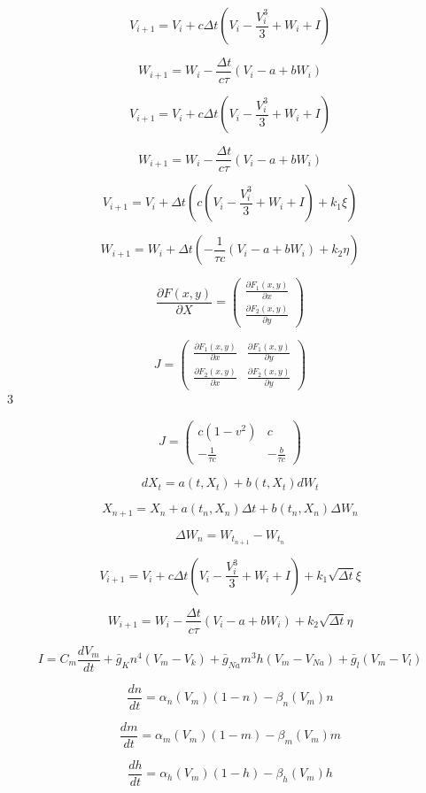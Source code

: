 \documentclass[11pt, oneside]{article}   	%
\begin{document}
$$V_{i+1}=V_i + c \Delta t \left(       V_i -\frac{V_i^3}{3} +W_i +I  \right) $$

$$W_{i+1} = W_i - \frac{\Delta t}{c \tau} \left(  V_i - a + b W_i        \right) $$


$$V_{i+1}=V_i + c \Delta t \left(       V_i -\frac{V_i^3}{3} +W_i +I  \right) $$

$$W_{i+1} = W_i - \frac{\Delta t}{c \tau} \left(  V_i - a + b W_i        \right) $$


$$V_{i+1}=V_i + \Delta t \left(    c(   V_i -\frac{V_i^3}{3} +W_i +I ) + k_1 \xi  \right) $$

$$W_{i+1} = W_i + \Delta t  \left(  -\frac{1}{\tau c}(V_i - a + b W_i) +  k_2 \eta       \right) $$


$$\frac{\partial F(x,y)}{\partial X} =\left(
\begin{matrix}
\frac{\partial F_1 (x,y)}{\partial x} \\
\frac{\partial F_2 (x,y)}{\partial y}
\end{matrix} \right) $$

$$J=\left(
\begin{matrix}
\frac{\partial F_1(x,y)}{\partial x} & \frac{\partial F_1(x,y)}{\partial y} \\
\frac{\partial F_2(x,y)}{\partial x} & \frac{\partial F_2(x,y)}{\partial y}
\end{matrix}
\right) $$3



$$J=\left(
\begin{matrix}
c(1-v^2) & c \\
-\frac{1}{\tau c} & -\frac{b}{\tau c}
\end{matrix}
\right) $$

$$ dX_t = a(t,X_t) + b(t,X_t) dW_t$$

$$ X_{n+1} = X_n + a(t_n,X_n) \Delta t + b(t_n,X_n) \Delta W_n$$

$$ \Delta W_n = W_{t_{n+1}}-W_{t_{n}}$$

$$V_{i+1}=V_i + c\Delta t \left(       V_i -\frac{V_i^3}{3} +W_i +I   \right) +k_1 \sqrt{\Delta t} \xi $$

$$W_{i+1} = W_i - \frac{\Delta t}{c \tau} \left(  V_i - a + b W_i        \right)  + k_2 \sqrt{\Delta t} \eta $$


$$I = C_m \frac{dV_m}{dt} + \bar{g}_Kn^4 (V_m-V_k) + \bar{g}_{Na}m^3h(V_m-V_{Na}) + \bar{g}_l(V_m-V_l)$$
    
    $$\frac{dn}{dt} = \alpha_n (V_m)(1-n) - \beta_n (V_m) n$$

$$ \frac{dm}{dt} = \alpha_m (V_m)(1-m) - \beta_m (V_m) m$$

$$\frac{dh}{dt} = \alpha_h (V_m)(1-h) - \beta_h (V_m) h $$
\end{document}
